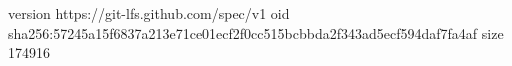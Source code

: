 version https://git-lfs.github.com/spec/v1
oid sha256:57245a15f6837a213e71ce01ecf2f0cc515bcbbda2f343ad5ecf594daf7fa4af
size 174916

